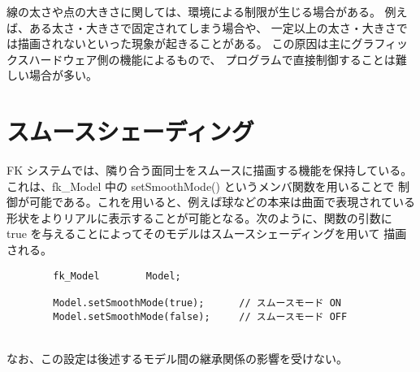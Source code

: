 線の太さや点の大きさに関しては、環境による制限が生じる場合がある。
例えば、ある太さ・大きさで固定されてしまう場合や、
一定以上の太さ・大きさでは描画されないといった現象が起きることがある。
この原因は主にグラフィックスハードウェア側の機能によるもので、
プログラムで直接制御することは難しい場合が多い。

\section{スムースシェーディング} \label{sec:smooth}
FK システムでは、隣り合う面同士をスムースに描画する機能を保持している。
これは、fk\_Model 中の setSmoothMode() というメンバ関数を用いることで
制御が可能である。これを用いると、例えば球などの本来は曲面で表現されている
形状をよりリアルに表示することが可能となる。次のように、関数の引数に
true を与えることによってそのモデルはスムースシェーディングを用いて
描画される。
\\
\begin{screen}
\begin{verbatim}
        fk_Model        Model;

        Model.setSmoothMode(true);      // スムースモード ON
        Model.setSmoothMode(false);     // スムースモード OFF
\end{verbatim}
\end{screen}
~ \\
なお、この設定は後述するモデル間の継承関係の影響を受けない。

% 
% 
% 

